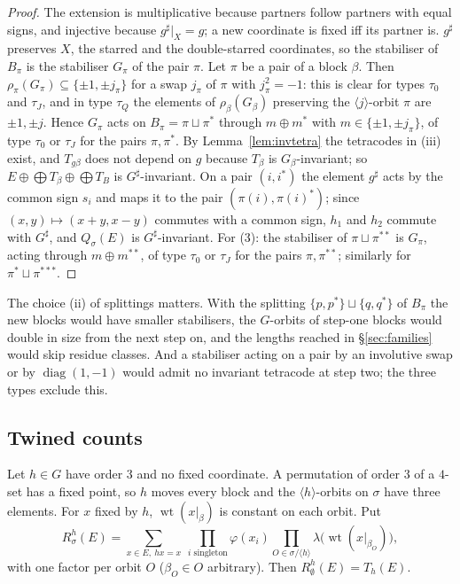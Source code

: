 \documentclass[11pt]{amsart}
\theoremstyle{definition}
\newcommand{\wt}{\operatorname{wt}}
\begin{document}
\begin{proof}
The extension is multiplicative because partners follow partners with equal signs, and injective
because $g^\sharp|_X=g$; a new coordinate is fixed iff its partner is. $g^\sharp$ preserves $X$, the
starred and the double-starred coordinates, so the stabiliser of $B_\pi$ is the stabiliser $G_\pi$
of the pair $\pi$. Let $\pi$ be a pair of a block $\beta$. Then $\rho_\pi(G_\pi)\subseteq\{\pm1,
\pm j_\pi\}$ for a swap $j_\pi$ of $\pi$ with $j_\pi^2=-1$: this is clear for types $\tau_0$ and
$\tau_J$, and in type $\tau_Q$ the elements of $\rho_\beta(G_\beta)$ preserving the
$\langle j\rangle$-orbit $\pi$ are $\pm1,\pm j$. Hence $G_\pi$ acts on $B_\pi=\pi\sqcup\pi^*$ through
$m\oplus m^*$ with $m\in\{\pm1,\pm j_\pi\}$, of type $\tau_0$ or $\tau_J$ for the pairs $\pi,\pi^*$.
By Lemma~\ref{lem:invtetra} the tetracodes in (iii) exist, and $T_{g\beta}$ does not depend on $g$
because $T_\beta$ is $G_\beta$-invariant; so $E\oplus\bigoplus T_\beta\oplus\bigoplus T_B$ is
$G^\sharp$-invariant. On a pair $(i,i^*)$ the element $g^\sharp$ acts by the common sign $s_i$ and
maps it to the pair $(\pi(i),\pi(i)^*)$; since $(x,y)\mapsto(x+y,x-y)$ commutes with a common sign,
$h_1$ and $h_2$ commute with $G^\sharp$, and $Q_\sigma(E)$ is $G^\sharp$-invariant. For (3): the
stabiliser of $\pi\sqcup\pi^{**}$ is $G_\pi$, acting through $m\oplus m^{**}$, of type $\tau_0$ or
$\tau_J$ for the pairs $\pi,\pi^{**}$; similarly for $\pi^*\sqcup\pi^{***}$.
\end{proof}

The choice (ii) of splittings matters. With the splitting $\{p,p^*\}\sqcup\{q,q^*\}$ of $B_\pi$ the
new blocks would have smaller stabilisers, the $G$-orbits of step-one blocks would double in size
from the next step on, and the lengths reached in \S\ref{sec:families} would skip residue classes.
And a stabiliser acting on a pair by an involutive swap or by $\operatorname{diag}(1,-1)$ would admit
no invariant tetracode at step two; the three types exclude this.

\subsection{Twined counts}
Let $h\in G$ have order $3$ and no fixed coordinate. A permutation of order $3$ of a $4$-set has a
fixed point, so $h$ moves every block and the $\langle h\rangle$-orbits on $\sigma$ have three
elements. For $x$ fixed by $h$, $\wt(x|_\beta)$ is constant on each orbit. Put
\[
  R^h_\sigma(E)=\sum_{x\in E,\ hx=x}\ \prod_{i\text{ singleton}}\varphi(x_i)
  \prod_{O\in\sigma/\langle h\rangle}\lambda\bigl(\wt(x|_{\beta_O})\bigr),
\]
with one factor per orbit $O$ ($\beta_O\in O$ arbitrary). Then $R^h_\emptyset(E)=T_h(E)$.
\end{document}
